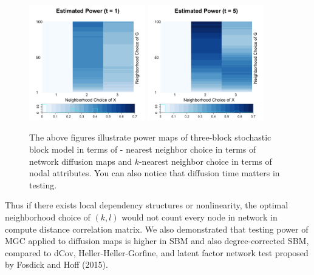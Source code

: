 \documentclass[simplex.tex]{subfiles}
\begin{document}
\begin{figure}[h!]
\begin{cframed}
\centering
\includegraphics[width=0.45\textwidth]{./figs/msnt1.png}
\includegraphics[width=0.45\textwidth]{./figs/msnt2.png}
\caption{
The above figures illustrate power maps of
three-block stochastic block model in terms of - nearest neighbor choice
in terms of network diffusion maps and $k$-nearest neighbor choice in
terms of nodal attributes. You can also notice that diffusion time
matters in testing. 
}
\label{fig:msnt}
\end{cframed}
\end{figure}

Thus if there exists
local dependency structures or nonlinearity, the optimal neighborhood
choice of $(k,l)$ would not count every node in network in compute
distance correlation matrix. We also demonstrated that testing power of MGC
applied to diffusion maps is higher in SBM and also degree-corrected
SBM, compared to dCov, Heller-Heller-Gorfine, and latent factor network
test proposed by Fosdick and Hoff (2015).
\end{document}
